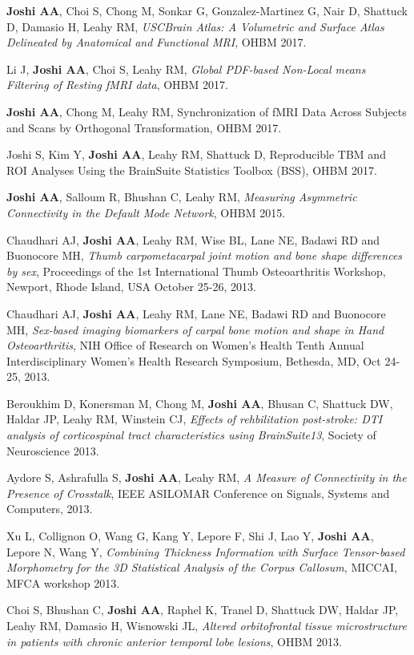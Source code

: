 \documentclass[overlapped,line,letterpaper]{res}
\begin{document}
\begin{resume}
\textbf{Joshi AA}, Choi S, Chong M, Sonkar G, Gonzalez-Martinez G, Nair D, Shattuck D,  Damasio H, Leahy RM, \textit{USCBrain Atlas: A Volumetric and Surface Atlas Delineated by Anatomical and
Functional MRI}, OHBM 2017.

Li J, \textbf{Joshi AA}, Choi S, Leahy RM, \textit{Global PDF-based Non-Local means Filtering of Resting fMRI data}, OHBM 2017.

\textbf{Joshi AA}, Chong M, Leahy RM, Synchronization of fMRI Data Across Subjects and Scans by Orthogonal Transformation, OHBM 2017.

Joshi S, Kim Y, \textbf{Joshi AA}, Leahy RM,  Shattuck D, Reproducible TBM and ROI Analyses Using the BrainSuite Statistics Toolbox (BSS), OHBM 2017.

\textbf{Joshi AA}, Salloum R, Bhushan C, Leahy RM, \textit{Measuring Asymmetric Connectivity in the Default Mode Network}, OHBM 2015.

Chaudhari AJ, \textbf{Joshi AA}, Leahy RM, Wise BL, Lane NE, Badawi RD and Buonocore MH, \textit{Thumb carpometacarpal joint motion and bone shape differences by sex}, Proceedings of the 1st International Thumb Osteoarthritis Workshop, Newport, Rhode Island, USA October 25-26, 2013.

Chaudhari AJ, \textbf{Joshi AA}, Leahy RM, Lane NE, Badawi RD and Buonocore MH, \textit{Sex-based imaging biomarkers of carpal bone motion and shape in Hand Osteoarthritis}, NIH Office of Research on Women's Health Tenth Annual Interdisciplinary Women's Health Research Symposium, Bethesda, MD, Oct 24-25, 2013.

Beroukhim D, Konersman M, Chong M, \textbf{Joshi AA}, Bhusan C, Shattuck DW, Haldar JP, Leahy RM, Winstein CJ, \textit{Effects of rehbilitation post-stroke: DTI analysis of corticospinal tract characteristics using BrainSuite13}, Society of Neuroscience 2013.

Aydore S, Ashrafulla S, \textbf{Joshi AA}, Leahy RM, \textit{A Measure of Connectivity in the Presence of Crosstalk}, IEEE ASILOMAR Conference on Signals, Systems and Computers, 2013.

Xu L, Collignon O, Wang G, Kang Y, Lepore F, Shi J, Lao Y, \textbf{Joshi AA}, Lepore N, Wang Y, \textit{Combining Thickness Information with Surface Tensor-based Morphometry for the 3D Statistical Analysis of the Corpus Callosum}, MICCAI, MFCA workshop 2013.

Choi S, Bhushan C, \textbf{Joshi AA}, Raphel K, Tranel D, Shattuck DW, Haldar JP, Leahy RM, Damasio H, Wisnowski JL, \textit{Altered orbitofrontal tissue microstructure in patients with chronic anterior temporal lobe lesions}, OHBM 2013.


\end{resume}
\end{document}
